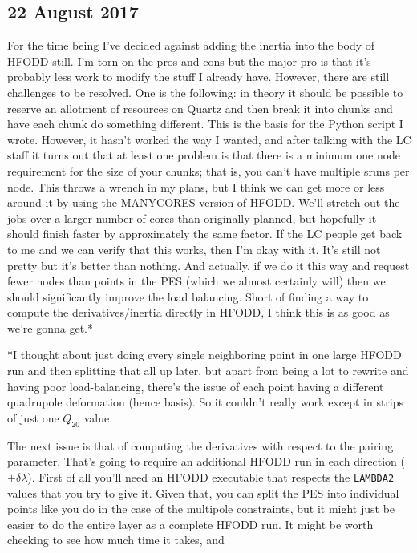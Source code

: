 \subsection*{22 August 2017}
For the time being I've decided against adding the inertia into the body of HFODD still. I'm torn on the pros and cons but the major pro is that it's probably less work to modify the stuff I already have. However, there are still challenges to be resolved. One is the following: in theory it should be possible to reserve an allotment of resources on Quartz and then break it into chunks and have each chunk do something different. This is the basis for the Python script I wrote. However, it hasn't worked the way I wanted, and after talking with the LC staff it turns out that at least one problem is that there is a minimum one node requirement for the size of your chunks; that is, you can't have multiple sruns per node. This throws a wrench in my plans, but I think we can get more or less around it by using the MANYCORES version of HFODD. We'll stretch out the jobs over a larger number of cores than originally planned, but hopefully it should finish faster by approximately the same factor. If the LC people get back to me and we can verify that this works, then I'm okay with it. It's still not pretty but it's better than nothing. And actually, if we do it this way and request fewer nodes than points in the PES (which we almost certainly will) then we should significantly improve the load balancing. Short of finding a way to compute the derivatives/inertia directly in HFODD, I think this is as good as we're gonna get.*

*I thought about just doing every single neighboring point in one large HFODD run and then splitting that all up later, but apart from being a lot to rewrite and having poor load-balancing, there's the issue of each point having a different quadrupole deformation (hence basis). So it couldn't really work except in strips of just one $Q_{20}$ value.

The next issue is that of computing the derivatives with respect to the pairing parameter. That's going to require an additional HFODD run in each direction ($\pm\delta\lambda$). First of all you'll need an HFODD executable that respects the \texttt{LAMBDA2} values that you try to give it. Given that, you can split the PES into individual points like you do in the case of the multipole constraints, but it might just be easier to do the entire layer as a complete HFODD run. It might be worth checking to see how much time it takes, and 

